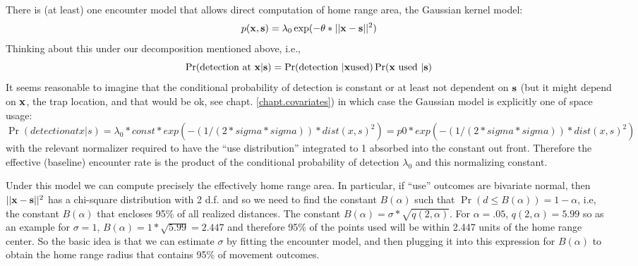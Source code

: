 There is (at least) one encounter model that allows direct computation
of home range area, the 
 Gaussian kernel model:
\[
p({\bf x},{\bf s}) = \lambda_{0} \exp(-\theta*||{\bf x}-{\bf s}||^2)         
\]
Thinking about this under our decomposition mentioned above, i.e., 
\[
\Pr(\mbox{detection at } {\bf x} | {\bf s}) = \Pr(\mbox{detection } |
{\bf x} \mbox{used})\Pr({\bf x} \mbox{ used } | {\bf s})
\]
It seems reasonable to imagine that the conditional probability of
detection is constant or at least not dependent on ${\bf s}$ (but it
might depend on ${\bf x}$, the trap location, and that would be ok,
see chapt. \ref{chapt.covariates}) in which case the Gaussian model is
explicitly one of space usage:
\[
\Pr(detection at x | s) = \lambda_{0}*const*exp(- (1/(2*sigma*sigma))*dist(x,s)^2)
		            =  p0*exp(- (1/(2*sigma*sigma))*dist(x,s)^2)
\]
with the relevant normalizer required to have the ``use distribution''
integrated to 1 absorbed into the constant out front. 
Therefore the effective (baseline) encounter rate is
the product of the conditional probability of detection $\lambda_{0}$
and this normalizing constant.

Under this model we can compute precisely the effectively home range
area. In particular, if ``use'' outcomes are bivariate
normal, then $||{\bf x}-{\bf s}||^2$ has a chi-square distribution with
2 d.f. and so we need to find the constant $B(\alpha)$ such that
$\Pr(d\le B(\alpha)) = 1-\alpha$, i.e, the constant $B(\alpha)$ that
encloses 95\% of all realized distances. The constant $B(\alpha) =
\sigma*\sqrt{q(2,\alpha)}$. For $\alpha=.05$, $q(2,\alpha) = 5.99$ so
as an example for $\sigma=1$, $B(\alpha) = 1*\sqrt{5.99} = 2.447$ and
therefore 95\% of the points used 
 will be within 2.447 units of
the home range center. So the basic idea is that we can estimate
$\sigma$
 by fitting the encounter model, 
and then plugging it into this expression for $B(\alpha)$ to obtain the home
range radius that contains 95\% of movement outcomes.

